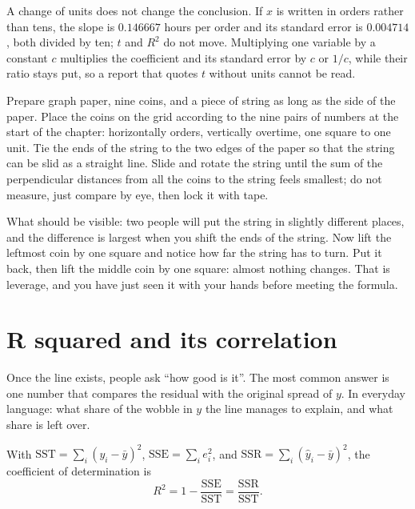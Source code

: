 A change of units does not change the conclusion. If $x$ is written in orders rather than tens,
the slope is $0.146667$ hours per order and its standard error is $0.004714$, both divided by
ten; $t$ and $R^2$ do not move. Multiplying one variable by a constant $c$ multiplies the
coefficient and its standard error by $c$ or $1/c$, while their ratio stays put, so a report
that quotes $t$ without units cannot be read.

\begin{tangan}
Prepare graph paper, nine coins, and a piece of string as long as the side of the paper. Place
the coins on the grid according to the nine pairs of numbers at the start of the chapter:
horizontally orders, vertically overtime, one square to one unit. Tie the ends of the string to
the two edges of the paper so that the string can be slid as a straight line. Slide and rotate
the string until the sum of the perpendicular distances from all the coins to the string feels
smallest; do not measure, just compare by eye, then lock it with tape.

What should be visible: two people will put the string in slightly different places, and the
difference is largest when you shift the ends of the string. Now lift the leftmost coin by one
square and notice how far the string has to turn. Put it back, then lift the middle coin by one
square: almost nothing changes. That is leverage, and you have just seen it with your hands
before meeting the formula.
\end{tangan}

\section{R squared and its correlation}

Once the line exists, people ask ``how good is it''. The most common answer is one number that
compares the residual with the original spread of $y$. In everyday language: what share of the
wobble in $y$ the line manages to explain, and what share is left over.

\begin{definisi}[$R^2$]
With $\mathrm{SST}=\sum_i(y_i-\bar y)^2$, $\mathrm{SSE}=\sum_i e_i^2$, and
$\mathrm{SSR}=\sum_i(\hat y_i-\bar y)^2$, the coefficient of determination is
\[
R^2=1-\frac{\mathrm{SSE}}{\mathrm{SST}}=\frac{\mathrm{SSR}}{\mathrm{SST}} .
\]
\end{definisi}


